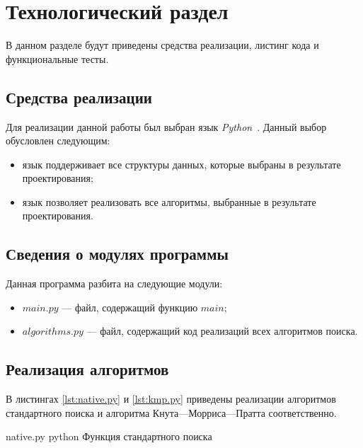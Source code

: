 \chapter{Технологический раздел}

В данном разделе будут приведены средства реализации, листинг кода и функциональные тесты.


\section{Средства реализации}

Для реализации данной работы был выбран язык \textit{Python}~\cite{python}.
Данный выбор обусловлен следующим:
\begin{itemize}
	\item язык поддерживает все структуры данных, которые выбраны в результате проектирования;
	\item язык позволяет реализовать все алгоритмы, выбранные в результате проектирования.
\end{itemize}


\section{Сведения о модулях программы}

Данная программа разбита на следующие модули:
\begin{itemize}
	\item $main.py$ --- файл, содержащий функцию $main$;
	\item $algorithms.py$ --- файл, содержащий код реализаций всех алгоритмов поиска.
\end{itemize}

\section{Реализация алгоритмов}

В листингах \ref{lst:native.py} и \ref{lst:kmp.py} приведены реализации алгоритмов стандартного поиска и алгоритма Кнута---Морриса---Пратта соответственно.

\clearpage
{}
{native.py} %
{python} %
{Функция стандартного поиска} %

